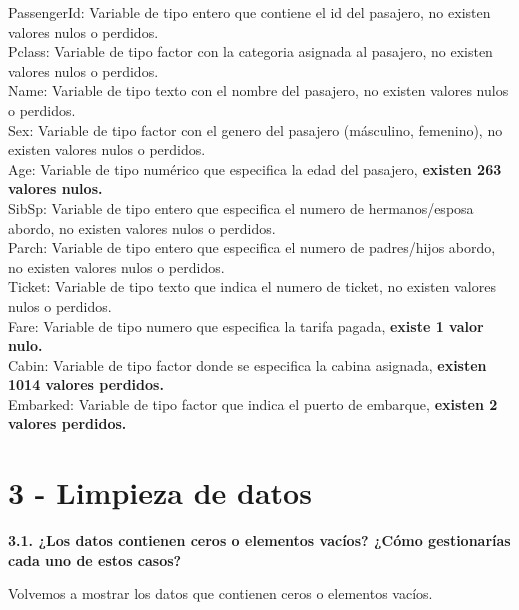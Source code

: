 \documentclass[]{article}
\newenvironment{Shaded}{\begin{snugshade}}{\end{snugshade}}
\newcommand{\KeywordTok}[1]{\textcolor[rgb]{0.13,0.29,0.53}{\textbf{#1}}}
\newcommand{\DataTypeTok}[1]{\textcolor[rgb]{0.13,0.29,0.53}{#1}}
\newcommand{\StringTok}[1]{\textcolor[rgb]{0.31,0.60,0.02}{#1}}
\newcommand{\CommentTok}[1]{\textcolor[rgb]{0.56,0.35,0.01}{\textit{#1}}}
\newcommand{\ControlFlowTok}[1]{\textcolor[rgb]{0.13,0.29,0.53}{\textbf{#1}}}
\newcommand{\OperatorTok}[1]{\textcolor[rgb]{0.81,0.36,0.00}{\textbf{#1}}}
\newcommand{\NormalTok}[1]{#1}
\begin{document}
PassengerId: Variable de tipo entero que contiene el id del pasajero, no
existen valores nulos o perdidos.\\
Pclass: Variable de tipo factor con la categoria asignada al pasajero,
no existen valores nulos o perdidos.\\
Name: Variable de tipo texto con el nombre del pasajero, no existen
valores nulos o perdidos.\\
Sex: Variable de tipo factor con el genero del pasajero (másculino,
femenino), no existen valores nulos o perdidos.\\
Age: Variable de tipo numérico que especifica la edad del pasajero,
\textbf{existen 263 valores nulos.}\\
SibSp: Variable de tipo entero que especifica el numero de
hermanos/esposa abordo, no existen valores nulos o perdidos.\\
Parch: Variable de tipo entero que especifica el numero de padres/hijos
abordo, no existen valores nulos o perdidos.\\
Ticket: Variable de tipo texto que indica el numero de ticket, no
existen valores nulos o perdidos.\\
Fare: Variable de tipo numero que especifica la tarifa pagada,
\textbf{existe 1 valor nulo.}\\
Cabin: Variable de tipo factor donde se especifica la cabina asignada,
\textbf{existen 1014 valores perdidos.}\\
Embarked: Variable de tipo factor que indica el puerto de embarque,
\textbf{existen 2 valores perdidos.}

\section{3 - Limpieza de datos}\label{limpieza-de-datos}

\textbf{3.1. ¿Los datos contienen ceros o elementos vacíos? ¿Cómo
gestionarías cada uno de estos casos?}

Volvemos a mostrar los datos que contienen ceros o elementos vacíos.

\begin{Shaded}
\end{Shaded}
\end{document}

